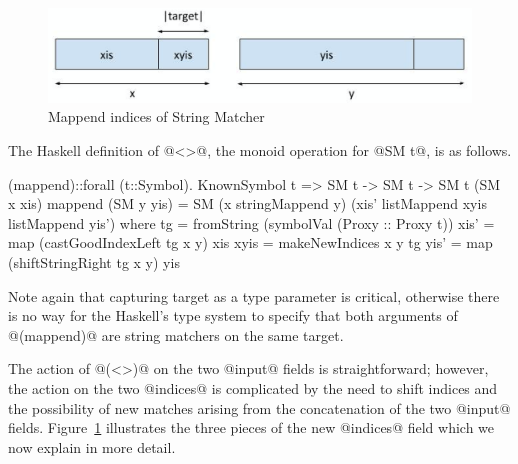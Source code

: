 \begin{figure}[t]
\includegraphics[scale=0.5]{text/stringmatcher/makeIndices}
\caption{Mappend indices of String Matcher}
\label{fig:mappend:indices}
\end{figure}
%
The Haskell definition of @<>@, the monoid operation for @SM t@, is as follows.
\begin{code}
(mappend)::forall (t::Symbol). KnownSymbol t => SM t -> SM t -> SM t
(SM x xis) mappend (SM y yis)
  = SM (x stringMappend y) (xis' listMappend xyis listMappend yis')
  where
    tg   = fromString (symbolVal (Proxy :: Proxy t))
    xis' = map (castGoodIndexLeft tg x y) xis
    xyis = makeNewIndices x y tg
    yis' = map (shiftStringRight tg x y) yis
\end{code}
Note again that capturing target as a type parameter is critical,
otherwise there is no way for the Haskell's type system to specify
that both arguments of @(mappend)@ are string matchers on the same target.

The action of @(<>)@ on the two @input@ fields is straightforward;
however, the action on the two @indices@ is complicated by the need to
shift indices and the possibility of new matches arising from the
concatenation of the two @input@
fields. Figure~\ref{fig:mappend:indices} illustrates the three pieces
of the new @indices@ field which we now explain in more detail.

